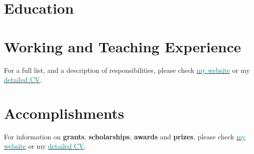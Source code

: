 \documentclass[11pt, a4paper]{awesome-cv}
\begin{document}
\hypertarget{education}{%
\section{Education}\label{education}}

\begin{cventries}
    \vspace{-4.0mm}
    \vspace{-4.0mm}
    \vspace{-4.0mm}
\end{cventries}

\hypertarget{working-and-teaching-experience}{%
\section{Working and Teaching
Experience}\label{working-and-teaching-experience}}

For a full list, and a description of responsibilities, please check
\href{https://jdleongomez.info/en/\#experience}{\textcolor{teal}{my website}}
or my
\href{https://jdleongomez.info/en/files/jdl_cv_en.pdf}{\textcolor{teal}{detailed CV}}.

\begin{cventries}
    \vspace{-4.0mm}
    \vspace{-4.0mm}
    \vspace{-4.0mm}
\end{cventries}

\hypertarget{accomplishments}{%
\section{Accomplishments}\label{accomplishments}}

For information on \textbf{grants}, \textbf{scholarships},
\textbf{awards} and \textbf{prizes}, please check
\href{https://jdleongomez.info/en/\#accomplishments}{\textcolor{teal}{my website}}
or my
\href{https://jdleongomez.info/en/files/jdl_cv_en.pdf}{\textcolor{teal}{detailed CV}}.
\end{document}
